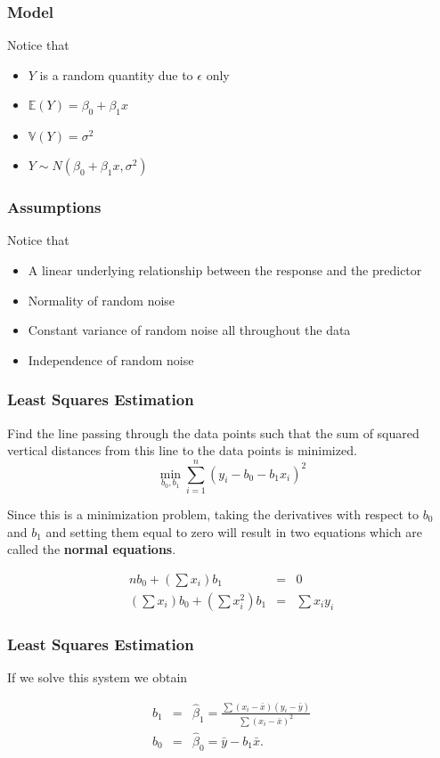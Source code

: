 \begin{frame}[fragile]\frametitle{Model}

Notice that
\begin{itemize}
\item $Y$ is a random quantity due to $\epsilon$ only
\item $\mathbb{E}(Y)=\beta_{0}+\beta_{1}x$
\item $\mathbb{V}(Y)=\sigma^{2}$
\item $Y\sim N(\beta_{0}+\beta_{1}x,\sigma^{2})$
\end{itemize}

\end{frame}

\begin{frame}[fragile]\frametitle{Assumptions}

Notice that
\begin{itemize}
\item A linear underlying relationship between the response and the predictor
\item Normality of random noise
\item Constant variance of random noise all throughout the data
\item Independence of random noise
\end{itemize}

\end{frame}

\begin{frame}[fragile]\frametitle{Least Squares Estimation}

Find the line passing through the data points such that the sum of squared vertical distances from this line to the data points is minimized.
\begin{displaymath}
\min_{b_{0},b_{1}}\sum_{i=1}^{n}(y_{i}-b_{0}-b_{1}x_{i})^{2}
\end{displaymath}

Since this is a minimization problem, taking the derivatives with respect to $b_{0}$ and $b_{1}$ and setting them equal to zero will result in two equations which are called the \textbf{normal equations}.

\begin{eqnarray*}
nb_{0}+(\sum x_{i})b_{1}&=&0 \\
(\sum x_{i})b_{0}+(\sum x_{i}^{2})b_{1}&=&\sum x_{i}y_{i}
\end{eqnarray*}

\end{frame}

\begin{frame}[fragile]\frametitle{Least Squares Estimation}

If we solve this system we obtain

\begin{eqnarray*}
b_{1}&=&\hat{\beta}_{1}=\frac{\sum(x_{i}-\bar{x})(y_{i}-\bar{y})}{\sum(x_{i}-\bar{x})^{2}}\\
b_{0}&=&\hat{\beta}_{0}=\bar{y}-b_{1}\bar{x}.
\end{eqnarray*}
\end{frame}

